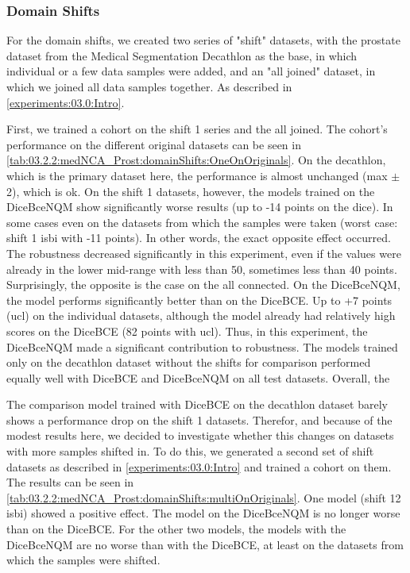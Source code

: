 \subsubsection{Domain Shifts}
\label{experiments:03.2.2:med_prost:onDomainShifts}
For the domain shifts, we created two series of "shift" datasets, with the prostate dataset from the Medical Segmentation Decathlon \cite{Antonelli:2022:MedSegmentationDecatlon} as the base, in which individual or a few data samples were added, and an "all joined" dataset, in which we joined all data samples together. As described in \autoref{experiments:03.0:Intro}.


First, we trained a cohort on the shift 1 series and the all joined. The cohort's performance on the different original datasets can be seen in \autoref{tab:03.2.2:medNCA_Prost:domainShifts:OneOnOriginals}. On the decathlon, which is the primary dataset here, the performance is almost unchanged (max $\pm$2), which is ok. On the shift 1 datasets, however, the models trained on the DiceBceNQM show significantly worse results (up to -14 points on the dice). In some cases even on the datasets from which the samples were taken (worst case: shift 1 isbi with -11 points). In other words, the exact opposite effect occurred. The robustness decreased significantly in this experiment, even if the values were already in the lower mid-range with less than 50, sometimes less than 40 points. Surprisingly, the opposite is the case on the all connected. On the DiceBceNQM, the model performs significantly better than on the DiceBCE. Up to +7 points (ucl) on the individual datasets, although the model already had relatively high scores on the DiceBCE (82 points with ucl). Thus, in this experiment, the DiceBceNQM made a significant contribution to robustness.
The models trained only on the decathlon dataset without the shifts for comparison performed equally well with DiceBCE and DiceBceNQM on all test datasets. Overall, the


The comparison model trained with DiceBCE on the decathlon dataset barely shows a performance drop on the shift 1 datasets. Therefor, and because of the modest results here, we decided to investigate whether this changes on datasets with more samples shifted in. To do this, we generated a second set of shift datasets as described in \autoref{experiments:03.0:Intro} and trained a cohort on them. The results can be seen in \autoref{tab:03.2.2:medNCA_Prost:domainShifts:multiOnOriginals}. One model (shift 12 isbi) showed a positive effect. The model on the DiceBceNQM is no longer worse than on the DiceBCE. For the other two models, the models with the DiceBceNQM are no worse than with the DiceBCE, at least on the datasets from which the samples were shifted.


